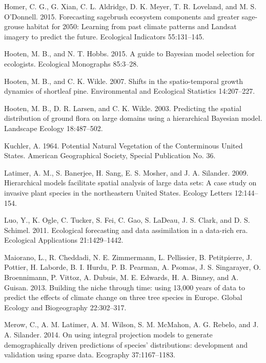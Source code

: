 \documentclass[12pt,]{article}
\begin{document}
\hypertarget{ref-Homer2015}{}
Homer, C. G., G. Xian, C. L. Aldridge, D. K. Meyer, T. R. Loveland, and
M. S. O'Donnell. 2015. Forecasting sagebrush ecosystem components and
greater sage-grouse habitat for 2050: Learning from past climate
patterns and Landsat imagery to predict the future. Ecological
Indicators 55:131--145.

\hypertarget{ref-Hooten2015}{}
Hooten, M. B., and N. T. Hobbs. 2015. A guide to Bayesian model
selection for ecologists. Ecological Monographs 85:3--28.

\hypertarget{ref-Hooten2007a}{}
Hooten, M. B., and C. K. Wikle. 2007. Shifts in the spatio-temporal
growth dynamics of shortleaf pine. Environmental and Ecological
Statistics 14:207--227.

\hypertarget{ref-Hooten2003}{}
Hooten, M. B., D. R. Larsen, and C. K. Wikle. 2003. Predicting the
spatial distribution of ground flora on large domains using a
hierarchical Bayesian model. Landscape Ecology 18:487--502.

\hypertarget{ref-Kuchler1964}{}
Kuchler, A. 1964. Potential Natural Vegetation of the Conterminous
United States. American Geographical Society, Special Publication No.
36.

\hypertarget{ref-Latimer2009}{}
Latimer, A. M., S. Banerjee, H. Sang, E. S. Mosher, and J. A. Silander.
2009. Hierarchical models facilitate spatial analysis of large data
sets: A case study on invasive plant species in the northeastern United
States. Ecology Letters 12:144--154.

\hypertarget{ref-Luo2011a}{}
Luo, Y., K. Ogle, C. Tucker, S. Fei, C. Gao, S. LaDeau, J. S. Clark, and
D. S. Schimel. 2011. Ecological forecasting and data assimilation in a
data-rich era. Ecological Applications 21:1429--1442.

\hypertarget{ref-Maiorano2013}{}
Maiorano, L., R. Cheddadi, N. E. Zimmermann, L. Pellissier, B.
Petitpierre, J. Pottier, H. Laborde, B. I. Hurdu, P. B. Pearman, A.
Psomas, J. S. Singarayer, O. Broennimann, P. Vittoz, A. Dubuis, M. E.
Edwards, H. A. Binney, and A. Guisan. 2013. Building the niche through
time: using 13,000 years of data to predict the effects of climate
change on three tree species in Europe. Global Ecology and Biogeography
22:302--317.

\hypertarget{ref-Merow2014}{}
Merow, C., A. M. Latimer, A. M. Wilson, S. M. McMahon, A. G. Rebelo, and
J. A. Silander. 2014. On using integral projection models to generate
demographically driven predictions of species' distributions:
development and validation using sparse data. Ecography 37:1167--1183.
\end{document}
